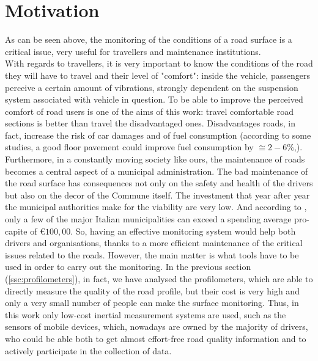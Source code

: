 \documentclass[tesi]{subfiles}
\begin{document}
	\section{Motivation}\label{sc:Motivation}
As can be seen above, the monitoring of the conditions of a road surface is a critical issue, very useful for travellers and maintenance institutions.\\
With regards to travellers, it is very important to know the conditions of the road they will have to travel and their level of "comfort": inside the vehicle, passengers perceive a certain amount of vibrations, strongly dependent on the suspension system associated with vehicle in question.
To be able to improve the perceived comfort of road users is one of the aims of this work: travel comfortable road sections is better than travel the disadvantaged ones. Disadvantages roads, in fact, increase the risk of car damages and of fuel consumption (according to some studies, a good floor pavement could improve fuel consumption by $\displaystyle{\cong{2-6\%}}$\cite{jackson2011synthesis},\cite{jointeapa}).
Furthermore, in a constantly moving society like ours, the maintenance of roads becomes a central aspect of a municipal administration. The bad maintenance of the road surface has consequences not only on the safety and health of the drivers but also on the decor of the Commune itself. 
The investment that year after year the municipal authorities make for the viability are very low. And according to \cite{piemonte2013finanza}, only a few of the major Italian municipalities can exceed a spending average pro-capite of $\displaystyle{\euro 100,00}$.
So, having an effective monitoring system would help both drivers and organisations, thanks to a more efficient maintenance of the critical issues related to the roads.
However, the main matter is what tools have to be used in order to carry out the monitoring. In the previous section (\ref{ssc:profilometers}), in fact, we have analysed the profilometers, which are able to directly measure the quality of the road profile, but their cost is very high and only a very small number of people can make the surface monitoring. 
Thus, in this work only low-cost inertial measurement systems are used, such as the sensors of mobile devices, which, nowadays are owned by the majority of drivers, who could be able both to get almost effort-free road quality information and to actively participate in the collection of data.
\end{document}
